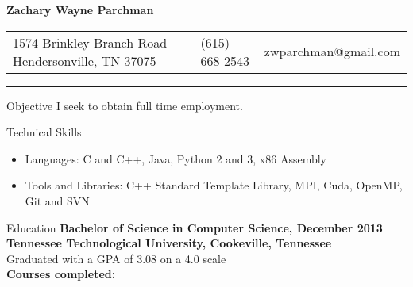 \documentclass[10pt]{res}
\begin{document}
 



\fontsize{10}{11}\selectfont

\begin{resume}

\vspace{-15mm}
\begin{center}
\begin{Huge}
    \bf{Zachary Wayne Parchman}
\end{Huge}
\end{center}
\vspace{-4mm}


\begin{large}
\begin{tabularx}{\textwidth}{p{2.10in} X X}
    1574 Brinkley Branch Road \newline Hendersonville, TN 37075
    & (615) 668-2543 & zwparchman@gmail.com\\
\end{tabularx}
\end{large}

\vspace{-0.30in}
\rule{\textwidth}{0.4pt}

\begin{section}{Objective}
    I seek to obtain full time employment.
\end{section}

\begin{section}{Technical Skills}
\begin{itemize}[leftmargin=*] \itemsep -2pt  %
    \item {Languages: C and C++, Java, Python 2 and 3, x86 Assembly}
    \item {Tools and Libraries: C++ Standard Template Library, MPI, Cuda, OpenMP, Git and SVN}
\end{itemize}
\end{section}

\begin{section}{Education}
    {\bf Bachelor of Science in Computer Science, December 2013\\
    Tennessee Technological University, Cookeville, Tennessee}\\
    Graduated with a GPA of 3.08 on a 4.0 scale\\
    {\bf Courses completed:}


\end{section}
\end{resume}
\end{document}
